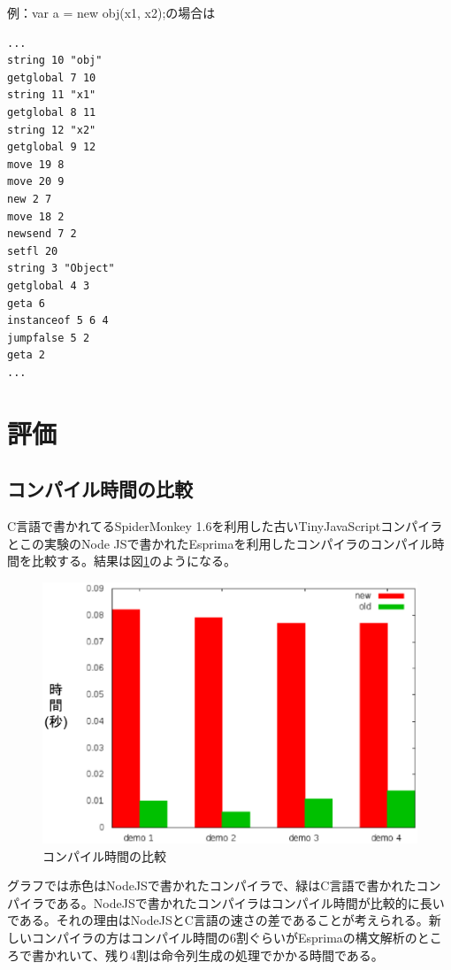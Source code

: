 \documentclass[12pt]{article}
\begin{document}
例：var a = new obj(x1, x2);の場合は\\

\begin{lstlisting}
...
string 10 "obj"
getglobal 7 10
string 11 "x1"
getglobal 8 11
string 12 "x2"
getglobal 9 12
move 19 8
move 20 9
new 2 7
move 18 2
newsend 7 2
setfl 20
string 3 "Object"
getglobal 4 3
geta 6
instanceof 5 6 4
jumpfalse 5 2
geta 2
...
\end{lstlisting}

\section{評価}
\subsection{コンパイル時間の比較}
C言語で書かれてるSpiderMonkey 1.6を利用した古いTinyJavaScriptコンパイラとこの実験のNode JSで書かれたEsprimaを利用したコンパイラのコンパイル時間を比較する。結果は図\ref{graph}のようになる。\\

\begin{figure}
\centering
\includegraphics[scale=0.75]{graph.eps}
\caption{コンパイル時間の比較}
\label{graph}
\end{figure}

グラフでは赤色はNodeJSで書かれたコンパイラで、緑はC言語で書かれたコンパイラである。NodeJSで書かれたコンパイラはコンパイル時間が比較的に長いである。それの理由はNodeJSとC言語の速さの差であることが考えられる。新しいコンパイラの方はコンパイル時間の6割ぐらいがEsprimaの構文解析のところで書かれいて、残り4割は命令列生成の処理でかかる時間である。
\FloatBarrier
\end{document}
